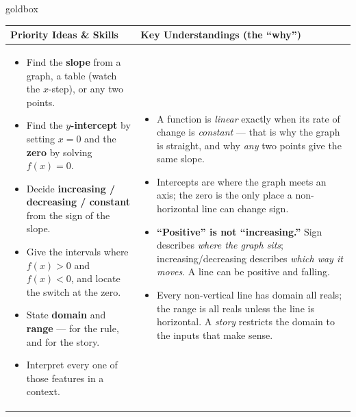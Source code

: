 \documentclass[10pt]{article}
\begin{document}
\renewcommand{\arraystretch}{1.4}
\begin{skillbox}{goldbox}
\begin{tabularx}{\linewidth}{@{}X|X@{}}
\textbf{Priority Ideas \& Skills} & \textbf{Key Understandings (the ``why'')} \\[2pt]
\hline
\vspace{-6pt}
\begin{itemize}[leftmargin=1.1em, nosep, after=\vspace{2pt}]
  \item Find the \textbf{slope} from a graph, a table (watch the $x$-step), or any two points.
  \item Find the \textbf{$y$-intercept} by setting $x=0$ and the \textbf{zero} by solving $f(x)=0$.
  \item Decide \textbf{increasing / decreasing / constant} from the sign of the slope.
  \item Give the intervals where $f(x)>0$ and $f(x)<0$, and locate the switch at the zero.
  \item State \textbf{domain} and \textbf{range} --- for the rule, and for the story.
  \item Interpret every one of those features in a context.
\end{itemize}
&
\vspace{-6pt}
\begin{itemize}[leftmargin=1.1em, nosep, after=\vspace{2pt}]
  \item A function is \emph{linear} exactly when its rate of change is \emph{constant} --- that is
        why the graph is straight, and why \emph{any} two points give the same slope.
  \item Intercepts are where the graph meets an axis; the zero is the only place a non-horizontal
        line can change sign.
  \item \textbf{``Positive'' is not ``increasing.''} Sign describes \emph{where the graph sits};
        increasing/decreasing describes \emph{which way it moves}. A line can be positive and falling.
  \item Every non-vertical line has domain all reals; the range is all reals unless the line is
        horizontal. A \emph{story} restricts the domain to the inputs that make sense.
\end{itemize}
\end{tabularx}
\end{skillbox}
\end{document}
